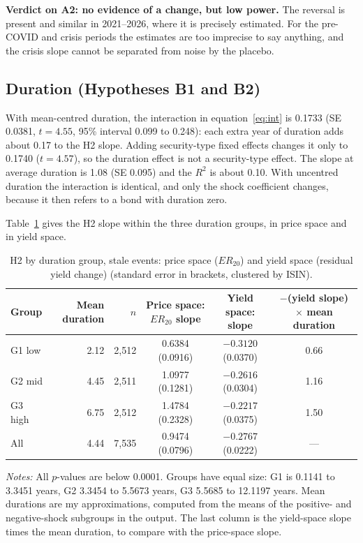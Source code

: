 \documentclass[a4paper,11pt]{article}
\begin{document}
\textbf{Verdict on A2: no evidence of a change, but low power.} The reversal is present and similar in 2021--2026, where it is precisely estimated. For the pre-COVID and crisis periods the estimates are too imprecise to say anything, and the crisis slope cannot be separated from noise by the placebo.

\subsection{Duration (Hypotheses B1 and B2)}
With mean-centred duration, the interaction in equation~\eqref{eq:int} is 0.1733 (SE 0.0381, $t = 4.55$, 95\% interval 0.099 to 0.248): each extra year of duration adds about 0.17 to the H2 slope. Adding security-type fixed effects changes it only to 0.1740 ($t = 4.57$), so the duration effect is not a security-type effect. The slope at average duration is 1.08 (SE 0.095) and the $R^2$ is about 0.10. With uncentred duration the interaction is identical, and only the shock coefficient changes, because it then refers to a bond with duration zero.

Table~\ref{tab:duration} gives the H2 slope within the three duration groups, in price space and in yield space.

\begin{table}[htbp]
\centering
\caption{H2 by duration group, stale events: price space ($ER_{20}$) and yield space (residual yield change) (standard error in brackets, clustered by ISIN).}
\label{tab:duration}
\footnotesize
\setlength{\tabcolsep}{4pt}
\begin{tabular}{lrrcc c}
\toprule
Group & Mean duration & $n$ & Price space: $ER_{20}$ slope & Yield space: slope & $-$(yield slope) $\times$ mean duration \\
\midrule
G1 low  & 2.12 & 2,512 & 0.6384 (0.0916) & $-0.3120$ (0.0370) & 0.66 \\
G2 mid  & 4.45 & 2,511 & 1.0977 (0.1281) & $-0.2616$ (0.0304) & 1.16 \\
G3 high & 6.75 & 2,512 & 1.4784 (0.2328) & $-0.2217$ (0.0375) & 1.50 \\
\midrule
All     & 4.44 & 7,535 & 0.9474 (0.0796) & $-0.2767$ (0.0222) & --- \\
\bottomrule
\end{tabular}

\vspace{4pt}
\begin{minipage}{0.97\textwidth}\footnotesize\raggedright
\textit{Notes:} All $p$-values are below 0.0001. Groups have equal size: G1 is 0.1141 to 3.3451 years, G2 3.3454 to 5.5673 years, G3 5.5685 to 12.1197 years. Mean durations are my approximations, computed from the means of the positive- and negative-shock subgroups in the output. The last column is the yield-space slope times the mean duration, to compare with the price-space slope.
\end{minipage}
\end{table}
\end{document}

